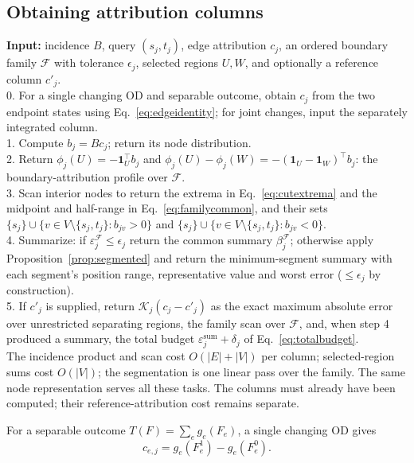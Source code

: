 \documentclass[a4paper,fleqn]{cas-sc}
\begin{document}
\subsection{Obtaining attribution columns}

\begin{algo}[t]
\caption{From an OD demand change to a reported spatial explanation}\label{alg:spatial}
\small
\textbf{Input:} incidence $B$, query $(s_j,t_j)$, edge attribution $c_j$,
an ordered boundary family $\mathcal F$ with tolerance $\epsilon_j$,
selected regions $U,W$, and optionally a reference column $c'_j$.\\
0. For a single changing OD and separable outcome, obtain $c_j$ from the two endpoint states using Eq.~\eqref{eq:edgeidentity}; for joint changes, input the separately integrated column.\\
1. Compute $b_j=Bc_j$; return its node distribution.\\
2. Return $\phi_j(U)=-\mathbf1_U^\top b_j$ and
$\phi_j(U)-\phi_j(W)=-(\mathbf1_U-\mathbf1_W)^\top b_j$: the
boundary-attribution profile over $\mathcal F$.\\
3. Scan interior nodes to return the extrema in Eq.~\eqref{eq:cutextrema}
and the midpoint and half-range in Eq.~\eqref{eq:familycommon},
and their sets $\{s_j\}\cup\{v\in V\setminus\{s_j,t_j\}:b_{jv}>0\}$ and
$\{s_j\}\cup\{v\in V\setminus\{s_j,t_j\}:b_{jv}<0\}$.\\
4. Summarize: if $\varepsilon_j^{\mathcal F}\le\epsilon_j$ return the common
summary $\beta_j^{\mathcal F}$; otherwise apply
Proposition~\ref{prop:segmented} and return the minimum-segment
summary with each segment's position range, representative value and
worst error ($\le\epsilon_j$ by construction).\\
5. If $c'_j$ is supplied, return $\mathcal K_j(c_j-c'_j)$ as the exact
maximum absolute error over unrestricted separating regions, the family
scan over $\mathcal F$, and, when step 4 produced a summary, the total
budget $\varepsilon^{\mathrm{sum}}_j+\delta_j$ of
Eq.~\eqref{eq:totalbudget}.\\
The incidence product and scan cost $O(|E|+|V|)$ per column; selected-region
sums cost $O(|V|)$; the segmentation is one linear pass over the family.
The same node representation serves all these tasks. The columns must already
have been computed; their reference-attribution cost remains separate.
\end{algo}
For a separable outcome $T(F)=\sum_e g_e(F_e)$, a single changing OD gives
\begin{equation}
c_{e,j}=g_e(F_e^1)-g_e(F_e^0).
\label{eq:edgeidentity}
\end{equation}
\end{document}
